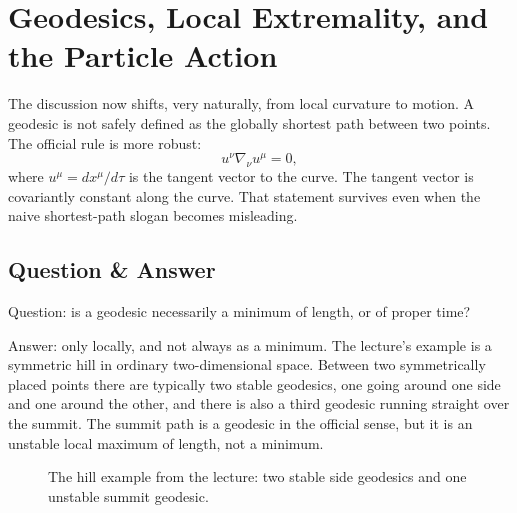 \section{Geodesics, Local Extremality, and the Particle Action}

The discussion now shifts, very naturally, from local curvature to motion. A geodesic is not safely defined as the globally shortest path between two points. The official rule is more robust:
\begin{equation}
u^\nu \nabla_\nu u^\mu = 0,
\end{equation}
where \(u^\mu = dx^\mu/d\tau\) is the tangent vector to the curve. The tangent vector is covariantly constant along the curve. That statement survives even when the naive shortest-path slogan becomes misleading.

\subsection{Question \& Answer}

Question: is a geodesic necessarily a minimum of length, or of proper time?

Answer: only locally, and not always as a minimum. The lecture's example is a symmetric hill in ordinary two-dimensional space. Between two symmetrically placed points there are typically two stable geodesics, one going around one side and one around the other, and there is also a third geodesic running straight over the summit. The summit path is a geodesic in the official sense, but it is an unstable local maximum of length, not a minimum.

\begin{figure}[t]
\centering
{}
\caption{The hill example from the lecture: two stable side geodesics and one unstable summit geodesic.}
\end{figure}

